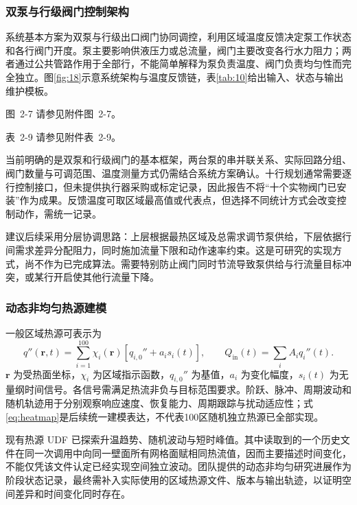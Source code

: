 \documentclass[UTF8]{midterm}
\makeatletter
\newcommand{\submissionnumber}[1]{\def\@currentlabel{#1}}
\makeatother
\begin{document}
\subsubsection{双泵与行级阀门控制架构}
系统基本方案为双泵与行级出口阀门协同调控，利用区域温度反馈决定泵工作状态和各行阀门开度。泵主要影响供液压力或总流量，阀门主要改变各行水力阻力；两者通过公共管路作用于全部行，不能简单解释为泵负责温度、阀门负责均匀性而完全独立。图\ref{fig:18}示意系统架构与温度反馈链，表\ref{tab:10}给出输入、状态与输出维护模板。

\par\noindent \begingroup\submissionnumber{2-7}\label{fig:18}\endgroup 图~2-7 请参见附件图~2-7。\par


\par\noindent \begingroup\submissionnumber{2-9}\label{tab:10}\endgroup 表~2-9 请参见附件表~2-9。\par


当前明确的是双泵和行级阀门的基本框架，两台泵的串并联关系、实际回路分组、阀门数量与可调范围、温度测量方式仍需结合系统方案确认。十行规划通常需要逐行控制接口，但未提供执行器采购或标定记录，因此报告不将“十个实物阀门已安装”作为成果。反馈温度可取区域最高值或代表点，但选择不同统计方式会改变控制动作，需统一记录。

建议后续采用分层协调思路：上层根据最热区域及总需求调节泵供给，下层依据行间需求差异分配阻力，同时施加流量下限和动作速率约束。这是可研究的实现方式，尚不作为已完成算法。需要特别防止阀门同时节流导致泵供给与行流量目标冲突，或某行开启使其他行流量下降。

\subsubsection{动态非均匀热源建模}
一般区域热源可表示为
\begin{equation}
q''(\bm r,t)=\sum_{i=1}^{100}\chi_i(\bm r)\left[q_{i,0}''+a_i s_i(t)\right],\qquad
Q_{\mathrm{in}}(t)=\sum_i A_i q_i''(t).\label{eq:heatmap}
\end{equation}
$\bm r$ 为受热面坐标，$\chi_i$ 为区域指示函数，$q_{i,0}''$ 为基值，$a_i$ 为变化幅度，$s_i(t)$ 为无量纲时间信号。各信号需满足热流非负与目标范围要求。阶跃、脉冲、周期波动和随机轨迹用于分别观察响应速度、恢复能力、周期跟踪与扰动适应性；式\eqref{eq:heatmap}是后续统一建模表达，不代表100区随机独立热源已全部实现。

现有热源 UDF 已探索升温趋势、随机波动与短时峰值。其中读取到的一个历史文件在同一次调用中向同一壁面所有网格面赋相同热流值，因而主要描述时间变化，不能仅凭该文件认定已经实现空间独立波动。团队提供的动态非均匀研究进展作为阶段状态记录，最终需补入实际使用的区域热源文件、版本与输出轨迹，以证明空间差异和时间变化同时存在。
\end{document}
